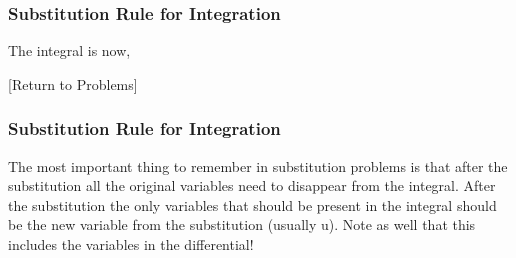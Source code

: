 \documentclass{beamer}
\begin{document}
\begin{frame}
	\frametitle{Substitution Rule for Integration}
	\large 
The integral is now,
                                
[Return to Problems]

\end{frame}
\begin{frame}
	\frametitle{Substitution Rule for Integration}
	\large 
The most important thing to remember in substitution problems is that after the substitution all the original variables need to disappear from the integral.  After the substitution the only variables that should be present in the integral should be the new variable from the substitution (usually u).  Note as well that this includes the variables in the differential!
 
\end{frame}
\end{document}
